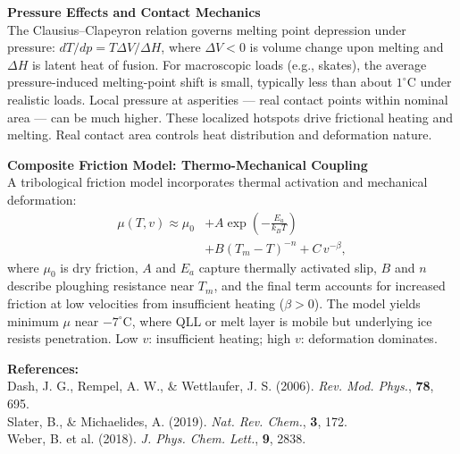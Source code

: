 \begin{technical}
\textbf{Pressure Effects and Contact Mechanics}\\[0.5em]
The Clausius–Clapeyron relation governs melting point depression under pressure: $dT/dp = T \Delta V/\Delta H$, where $\Delta V < 0$ is volume change upon melting and $\Delta H$ is latent heat of fusion. For macroscopic loads (e.g., skates), the average pressure-induced melting-point shift is small, typically less than about $1^\circ\text{C}$ under realistic loads. Local pressure at asperities — real contact points within nominal area — can be much higher. These localized hotspots drive frictional heating and melting. Real contact area controls heat distribution and deformation nature.

\textbf{Composite Friction Model: Thermo-Mechanical Coupling}\\[0.5em]
A tribological friction model incorporates thermal activation and mechanical deformation:
\begin{align*}
    \mu(T, v) \approx \mu_0 &+ A \exp\!\left(-\frac{E_a}{k_B T}\right) \\
    &+ B (T_m - T)^{-n} + C\, v^{-\beta},
\end{align*}
where $\mu_0$ is dry friction, $A$ and $E_a$ capture thermally activated slip, $B$ and $n$ describe ploughing resistance near $T_m$, and the final term accounts for increased friction at low velocities from insufficient heating ($\beta > 0$). The model yields minimum $\mu$ near $-7^\circ$C, where QLL or melt layer is mobile but underlying ice resists penetration. Low $v$: insufficient heating; high $v$: deformation dominates.

\vspace{0.5em}
\textbf{References:}\\
{\footnotesize
Dash, J. G., Rempel, A. W., \& Wettlaufer, J. S. (2006). \textit{Rev. Mod. Phys.}, \textbf{78}, 695.\\
Slater, B., \& Michaelides, A. (2019). \textit{Nat. Rev. Chem.}, \textbf{3}, 172.\\
Weber, B. et al. (2018). \textit{J. Phys. Chem. Lett.}, \textbf{9}, 2838.
}

\end{technical}
